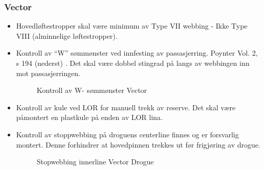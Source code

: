 \subsubsection{Vector}
\begin{itemize}
	\item Hovedløftestropper skal være minimum av Type VII webbing - Ikke Type VIII (alminnelige løftestropper).
	\item Kontroll av ``W'' sømmønster ved innfesting av passasjerring. Poynter Vol. 2, s 194 (nederst) . Det skal være dobbel stingrad på langs av webbingen inn mot passasjerringen.
	\begin{figure}
		\caption{Kontroll av W- sømmønster Vector}
	\end{figure}

	\item Kontroll av kule ved LOR for manuell trekk av reserve. Det skal være påmontert en plastkule på enden av LOR lina.
	\item Kontroll av stoppwebbing på droguens centerline finnes og er forsvarlig montert. Denne forhindrer at hovedpinnen trekkes ut før frigjøring av drogue.
	\begin{figure}
		\caption{Stopwebbing innerline Vector Drogue}
	\end{figure}


\end{itemize}
